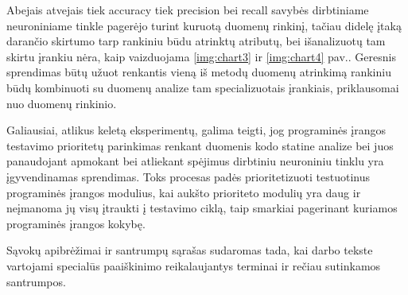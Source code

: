 \documentclass{VUMIFPSbakalaurinis}
\begin{document}
Abejais atvejais tiek accuracy tiek precision bei recall savybės dirbtiniame neuroniniame tinkle pagerėjo turint kuruotą duomenų rinkinį, tačiau didelę įtaką darančio skirtumo tarp rankiniu būdu atrinktų atributų, bei išanalizuotų tam skirtu įrankiu nėra, kaip vaizduojama \ref{img:chart3} ir \ref{img:chart4} pav.. Geresnis sprendimas būtų užuot renkantis vieną iš metodų duomenų atrinkimą rankiniu būdų kombinuoti su duomenų analize tam specializuotais įrankiais, priklausomai nuo duomenų rinkinio. 

Galiausiai, atlikus keletą eksperimentų, galima teigti, jog programinės įrangos testavimo prioritetų parinkimas renkant duomenis kodo statine analize bei juos panaudojant apmokant bei atliekant spėjimus dirbtiniu neuroniniu tinklu yra įgyvendinamas sprendimas. Toks procesas padės prioritetizuoti testuotinus programinės įrangos modulius, kai aukšto prioriteto modulių yra daug ir neįmanoma jų visų įtraukti į testavimo ciklą, taip smarkiai pagerinant kuriamos programinės įrangos kokybę.

\printbibliography[heading=bibintoc]  %

Sąvokų apibrėžimai ir santrumpų sąrašas sudaromas tada, kai darbo tekste
vartojami specialūs paaiškinimo reikalaujantys terminai ir rečiau sutinkamos
santrumpos.

\appendix  %
\end{document}
